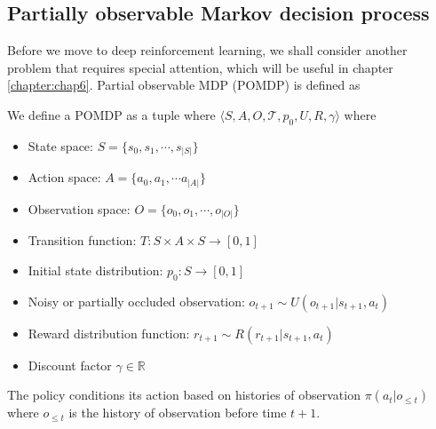 \subsection{Partially observable Markov decision process}
Before we move to deep reinforcement learning, we shall consider another problem that requires special attention, which will be useful in chapter \ref{chapter:chap6}. Partial observable MDP (POMDP) is defined as 
\begin{definition}
    We define a POMDP as a tuple where $\langle S, A, O, \mathcal{T}, p_0, U, R, \gamma\rangle$ where
    \begin{itemize}
        \item State space: $S = \{s_0, s_1, \cdots , s_{|S|}\}$
        \item Action space: $A = \{a_0, a_1, \cdots a_{|A|}\}$
        \item Observation space: $O = \{o_0, o_1, \cdots, o_{|O|}\}$
        \item Transition function: $T: S \times A \times S \rightarrow [0, 1]$
        \item Initial state distribution: $p_0 : S \rightarrow [0, 1]$
        \item Noisy or partially occluded observation: $o_{t+1} \sim U(o_{t+1} | s_{t+1}, a_t)$
        \item Reward distribution function: $r_{t+ 1} \sim R(r_{t+1} | s_{t+1}, a_t)$
        \item Discount factor $\gamma \in \mathbb{R}$ 
    \end{itemize}
    The policy conditions its action based on histories of observation $\pi(a_t | o_{\le t})$ where $o_{\le t}$ is the history of observation before time $t+1$. 
\end{definition}